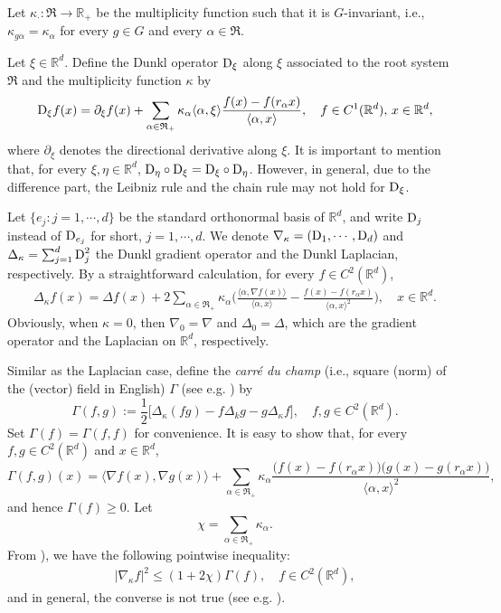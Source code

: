 \documentclass[11pt,a4paper]{article}
\def\R{\mathbb{R}}
\def\D{\mathbb{D}}
\def\D{\textup{D}}
\theoremstyle{definition}\newtheorem{remark}[theorem]{Remark}
\begin{document}
Let $\kappa_\cdot: \mathfrak{R}\rightarrow\R_+$ be the multiplicity function such that it is $G$-invariant, i.e., $\kappa_{g\alpha}=\kappa_\alpha$ for every $g\in G$ and every $\alpha\in\mathfrak{R}$.

Let $\xi\in\R^d$. Define the Dunkl operator $\D_\xi$ along $\xi$ associated to the root system $\mathfrak{R}$ and the multiplicity function $\kappa$  by
$$\D_\xi f(x)=\partial_\xi f(x)+\sum_{\alpha\in\mathfrak{R}_+}\kappa_\alpha \langle\alpha,\xi\rangle \frac{f(x)-f(r_\alpha x)}{\langle\alpha,x\rangle},\quad f\in C^1(\R^d),\,x\in\R^d,$$
where $\partial_\xi$ denotes the directional derivative along $\xi$. It is important to mention that, for every $\xi,\eta\in\R^d$, $\D_\eta\circ \D_\xi=\D_\xi\circ \D_\eta$. However, in general, due to the difference part, the Leibniz rule and the chain rule may not hold for $\D_\xi$.

Let $\{e_j: j=1,\cdots,d\}$ be the standard orthonormal basis of $\R^d$, and write $\D_j$ instead of $\D_{e_j}$ for short, $j=1,\cdots,d$. We denote $\nabla_\kappa=(\D_1,\cdots,\D_d)$ and $\Delta_\kappa=\sum_{j=1}^d \D_j^2$ the Dunkl gradient operator and the Dunkl Laplacian, respectively. By a straightforward calculation, for every $f\in C^2(\R^d)$,
\begin{eqnarray*}\label{Delta}
	\Delta_\kappa f(x)=\Delta f(x)+2\sum_{\alpha\in\mathfrak{R}_+}\kappa_\alpha\Big(\frac{\langle\alpha,\nabla f(x)\rangle}{\langle\alpha,x\rangle} - \frac{f(x)-f(r_\alpha x)}{\langle\alpha,x\rangle^2}\Big),\quad x\in\R^d.
\end{eqnarray*}
Obviously, when $\kappa=0$, then $\nabla_0=\nabla$ and $\Delta_0=\Delta$, which are the gradient operator and the Laplacian on $\R^d$, respectively.

Similar as the Laplacian case,  define the \emph{carr\'{e} du champ} (i.e., square (norm) of the (vector) field in English) $\Gamma$ (see e.g. \cite{BE1985}) by
$$\Gamma(f,g):=\frac{1}{2}\big[\Delta_\kappa(fg)-f\Delta_k g-g\Delta_\kappa f\big],\quad f,g\in C^2(\R^d).$$
Set $\Gamma(f)=\Gamma(f,f)$ for convenience. It is easy to show that, for every $f,g\in C^2(\R^d)$ and $x\in\R^d$,
\begin{equation}\label{Gamma-op}
\Gamma(f,g)(x)=\langle\nabla f(x),\nabla g(x)\rangle + \sum_{\alpha\in\mathfrak{R}_+}\kappa_\alpha\frac{\big(f(x)-f(r_\alpha x)\big)\big(g(x)-g(r_\alpha x)\big)}{\langle\alpha,x\rangle^2},
\end{equation}
and hence $\Gamma(f)\geq0$. Let
$$ \chi=\sum_{\alpha\in\mathfrak{R}_+}\kappa_\alpha.$$
From \cite[Remark 1.4(i)]{LZ2020}), we have the following pointwise inequality:
\begin{eqnarray}\label{grad-Gamma-comp}
|\nabla_\kappa f|^2\leq (1+2\chi)\Gamma(f),\quad f\in C^2(\R^d),
\end{eqnarray}
and in general, the converse is not true (see e.g. \cite[Theorem 3.5]{ML2019}).
\end{document}
